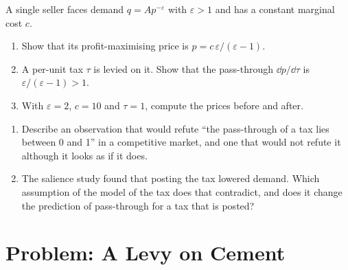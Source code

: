 \begin{exercise}[$\star\star\star$]\label{exo:b1:comparative-statics:monopoly}
A single seller faces demand $q = Ap^{-\varepsilon}$ with $\varepsilon > 1$ and
has a constant marginal cost $c$.
\begin{enumerate}
  \item Show that its profit-maximising price is $p = c\,\varepsilon/(\varepsilon - 1)$.
  \item A per-unit tax $\tau$ is levied on it. Show that the pass-through $\dd p/\dd\tau$ is $\varepsilon/(\varepsilon - 1) > 1$.
  \item With $\varepsilon = 2$, $c = 10$ and $\tau = 1$, compute the prices before and after.
\end{enumerate}
\end{exercise}

\begin{exercise}[$\star\star\star$]\label{exo:b1:comparative-statics:refute}
\begin{enumerate}
  \item Describe an observation that would refute ``the pass-through of a tax lies between 0 and 1'' in a competitive market, and one that would not refute it although it looks as if it does.
  \item The salience study found that posting the tax lowered demand. Which assumption of the model of the tax does that contradict, and does it change the prediction of pass-through for a tax that is posted?
\end{enumerate}
\end{exercise}

\section{Problem: A Levy on Cement}\label{sec:b1:comparative-statics:problem}

